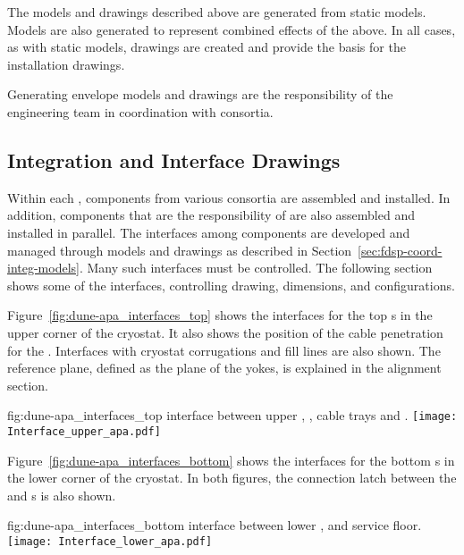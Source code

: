 The models and drawings described above are generated from static
models. Models are also generated to represent combined effects of the
above. In all cases, as with static models, \twod drawings are created
and provide the basis for the installation drawings.


Generating envelope models and drawings are the responsibility of the
 engineering team in coordination with consortia.


\subsection{Integration and Interface Drawings}
\label{sec:fdsp-coord-integ-drawings}

Within each , components from various consortia are assembled
and installed. In addition, components that are the responsibility of
 are also assembled and installed in parallel. The interfaces
among components are developed and managed through models and drawings
as described in Section~\ref{sec:fdsp-coord-integ-models}. Many such
interfaces must be controlled. The following section shows some of the
interfaces, controlling drawing, dimensions, and configurations. 


Figure~\ref{fig:dune-apa_interfaces_top} shows the interfaces for the
top s in the upper corner of the cryostat. It also shows the position
of the cable penetration for the . Interfaces with cryostat
corrugations and  fill lines are also shown. The reference plane,
defined as the plane of the  yokes, is explained in the
alignment section. 

\begin{dunefigure}{fig:dune-apa_interfaces_top}
  { interface between upper , , cable
    trays and .}
  \texttt{[image: Interface\_upper\_apa.pdf]}
\end{dunefigure}


Figure~\ref{fig:dune-apa_interfaces_bottom} shows the interfaces for
the bottom s in the lower corner of the cryostat. In both figures,
the connection latch between the  and s is also
shown.
\begin{dunefigure}{fig:dune-apa_interfaces_bottom}
  { interface between lower ,  and 
    service floor.}
  \texttt{[image: Interface\_lower\_apa.pdf]}
\end{dunefigure}


